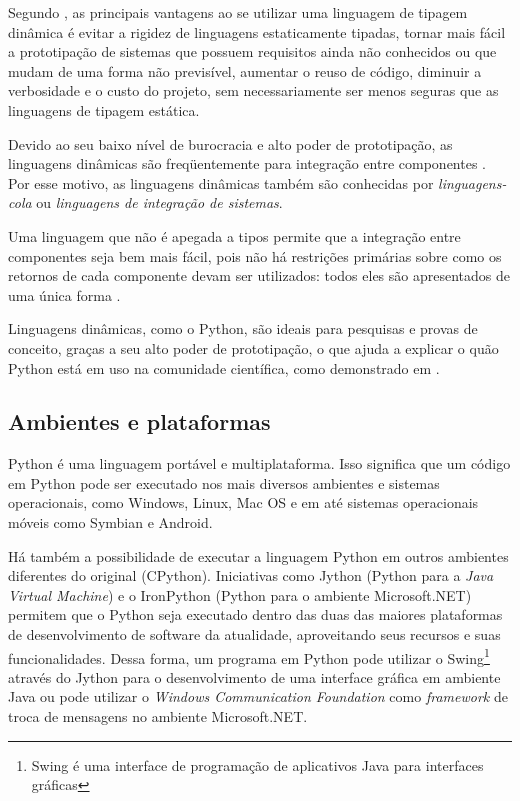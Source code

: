 Segundo \cite{dynamic_langs}, as principais vantagens ao se utilizar uma linguagem de tipagem dinâmica é evitar a rigidez de linguagens estaticamente tipadas, tornar mais fácil a prototipação de sistemas que possuem requisitos ainda não conhecidos ou que mudam de uma forma não previsível, aumentar o reuso de código, diminuir a verbosidade e o custo do projeto, sem necessariamente ser menos seguras que as linguagens de tipagem estática.

Devido ao seu baixo nível de burocracia e alto poder de prototipação, as linguagens dinâmicas são freqüentemente para integração entre componentes \cite{scripting}. Por esse motivo, as linguagens dinâmicas também são conhecidas por \emph{linguagens-cola} ou \emph{linguagens de integração de sistemas}.

Uma linguagem que não é apegada a tipos permite que a integração entre componentes seja bem mais fácil, pois não há restrições primárias sobre como os retornos de cada componente devam ser utilizados: todos eles são apresentados de uma única forma \cite{scripting}.

Linguagens dinâmicas, como o Python, são ideais para pesquisas e provas de conceito, graças a seu alto poder de prototipação, o que ajuda a explicar o quão Python está em uso na comunidade científica, como demonstrado em \cite{python_scientific_world}.

\subsection{Ambientes e plataformas}

Python é uma linguagem portável e multiplataforma. Isso significa que um código em Python pode ser executado nos mais diversos ambientes e sistemas operacionais, como Windows, Linux, Mac OS e em até sistemas operacionais móveis como Symbian e Android.

Há também a possibilidade de executar a linguagem Python em outros ambientes diferentes do original (CPython). Iniciativas como Jython (Python para a \emph{Java Virtual Machine}) e o IronPython (Python para o ambiente Microsoft.NET) permitem que o Python seja executado dentro das duas das maiores plataformas de desenvolvimento de software da atualidade, aproveitando seus recursos e suas funcionalidades. Dessa forma, um programa em Python pode utilizar o Swing\footnote{Swing é uma interface de programação de aplicativos Java para interfaces gráficas} através do Jython para o desenvolvimento de uma interface gráfica em ambiente Java ou pode utilizar o \emph{Windows Communication Foundation} como \emph{framework} de troca de mensagens no ambiente Microsoft.NET.

